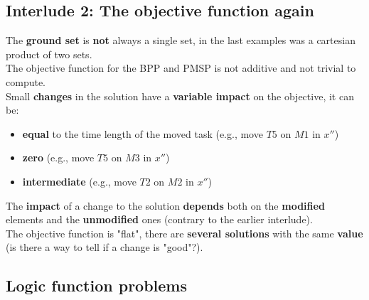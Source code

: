 \newpage

\subsection*{Interlude 2: The objective function again}
The \textbf{ground set} is \textbf{not} always a single set, in the last examples was a cartesian product of two sets. \\

The objective function for the BPP and PMSP is not additive and not trivial to compute. \\

Small \textbf{changes} in the solution have a \textbf{variable impact} on the objective, it can be: 
\begin{itemize}
	\item \textbf{equal} to the time length of the moved task (e.g., move $T5$ on $M1$ in $x''$)
	\item \textbf{zero} (e.g., move $T5$ on $M3$ in $x''$)
	\item \textbf{intermediate} (e.g., move $T2$ on $M2$ in $x''$)
\end{itemize}
The \textbf{impact} of a change to the solution \textbf{depends} both on the \textbf{modified} elements and the \textbf{unmodified} ones (contrary to the earlier interlude).\\

The objective function is "flat", there are \textbf{several solutions} with the same \textbf{value} (is there a way to tell if a change is "good"?).\\

\newpage

\subsection{Logic function problems}
